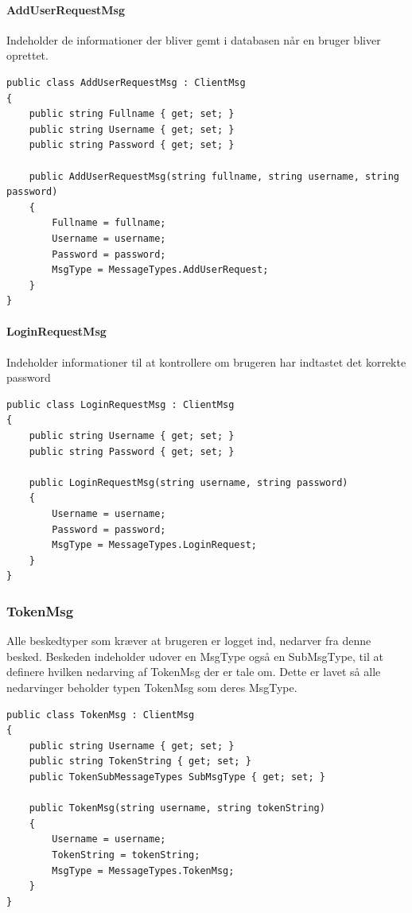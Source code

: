 \paragraph{AddUserRequestMsg}
Indeholder de informationer der bliver gemt i databasen når en bruger bliver oprettet.
\begin{lstlisting}[caption=AddUserRequestMsg, label=code:AddUserRequestMsg]
public class AddUserRequestMsg : ClientMsg
{
	public string Fullname { get; set; }
	public string Username { get; set; }
	public string Password { get; set; }
	
	public AddUserRequestMsg(string fullname, string username, string password)
	{
		Fullname = fullname;
		Username = username;
		Password = password;
		MsgType = MessageTypes.AddUserRequest;
	}
}
\end{lstlisting}

\paragraph{LoginRequestMsg}
Indeholder informationer til at kontrollere om brugeren har indtastet det korrekte password
\begin{lstlisting}[caption=LoginRequestMsg, label=code:LoginRequestMsg]
public class LoginRequestMsg : ClientMsg
{
	public string Username { get; set; }
	public string Password { get; set; }
	
	public LoginRequestMsg(string username, string password)
	{
		Username = username;
		Password = password;
		MsgType = MessageTypes.LoginRequest;
	}
}
\end{lstlisting}

\subsubsection{TokenMsg}
Alle beskedtyper som kræver at brugeren er logget ind, nedarver fra denne besked. Beskeden indeholder udover en MsgType også en SubMsgType, til at definere hvilken nedarving af TokenMsg der er tale om. Dette er lavet så alle nedarvinger beholder typen TokenMsg som deres MsgType.
\begin{lstlisting}[caption=TokenMsg, label=code:TokenMsg]
public class TokenMsg : ClientMsg
{
	public string Username { get; set; }
	public string TokenString { get; set; }
	public TokenSubMessageTypes SubMsgType { get; set; }
	
	public TokenMsg(string username, string tokenString)
	{
		Username = username;
		TokenString = tokenString;
		MsgType = MessageTypes.TokenMsg;
	}
}
\end{lstlisting}

